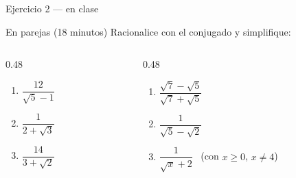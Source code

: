 \documentclass[aspectratio=169,10pt]{beamer}
\begin{document}
\begin{frame}{Ejercicio 2 — en clase}
  \begin{alertblock}{En parejas (18 minutos)}
    \scriptsize
    Racionalice con el conjugado y simplifique:

    \vspace{0.3cm}
    \begin{columns}[T,onlytextwidth]
      \begin{column}{0.48\textwidth}
        \begin{enumerate}\setlength{\itemsep}{0.24cm}
          \item $\dfrac{12}{\sqrt{5}-1}$
          \item $\dfrac{1}{2+\sqrt{3}}$
          \item $\dfrac{14}{3+\sqrt{2}}$
        \end{enumerate}
      \end{column}
      \begin{column}{0.48\textwidth}
        \begin{enumerate}\setlength{\itemsep}{0.24cm}
          \setcounter{enumi}{3}
          \item $\dfrac{\sqrt{7}-\sqrt{5}}{\sqrt{7}+\sqrt{5}}$
          \item $\dfrac{1}{\sqrt{5}-\sqrt{2}}$
          \item $\dfrac{1}{\sqrt{x}+2}$ \ (con $x \ge 0$, $x\neq 4$)
        \end{enumerate}
      \end{column}
    \end{columns}
  \end{alertblock}
\end{frame}
\end{document}
